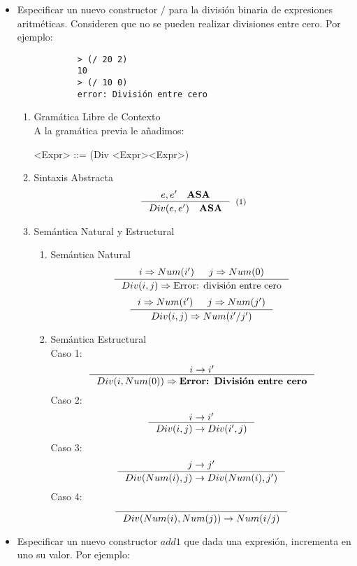 \documentclass{article}
\begin{document}
\begin{enumerate}
\begin{itemize}
        \item Especificar un nuevo constructor $/$ para la división binaria de expresiones aritméticas. Consideren que no se pueden realizar divisiones entre cero. Por ejemplo:

        \begin{verbatim}
            > (/ 20 2)
            10
            > (/ 10 0)
            error: División entre cero
        \end{verbatim}

        \begin{enumerate}
            \item Gramática Libre de Contexto
            \\
            A la gramática previa le añadimos:
            \\
            \begin{grammar}
                <Expr> ::= (Div <Expr><Expr>)
            \end{grammar}
            \item Sintaxis Abstracta
                \[
                    \inference{e,e' \quad \textbf{ASA}}{Div(e,e') \quad \textbf{ASA}}[(1)]
                \]
            \item Semántica Natural y Estructural
            \begin{enumerate}
                \item Semántica Natural
                \[ \inference{i\Rightarrow Num(i') & j\Rightarrow Num(0)}{Div(i,j)\Rightarrow \text{Error: división entre cero}}\]
                \[ \inference{i\Rightarrow Num(i') & j\Rightarrow Num(j')}{Div(i,j) \Rightarrow Num(i'/j')}\]
                \item Semántica Estructural\\
                Caso 1:
                \[ \inference{i \rightarrow i'}{Div(i,Num(0))\Rightarrow \textbf{Error: División entre cero}}\]
                Caso 2:
                \[ \inference{i\rightarrow i'}{Div(i,j)\rightarrow Div(i',j)}\]
                Caso 3:
                \[ \inference{j\rightarrow j'}{Div(Num(i),j)\rightarrow Div(Num(i),j')}\]
                Caso 4:
                \[ \inference{}{Div(Num(i),Num(j))\rightarrow Num(i/j)}\]
            \end{enumerate}
        \end{enumerate}

        \item Especificar un nuevo constructor $add1$ que dada una expresión, incrementa en uno su valor. Por ejemplo: 


\end{itemize}
\end{enumerate}
\end{document}
